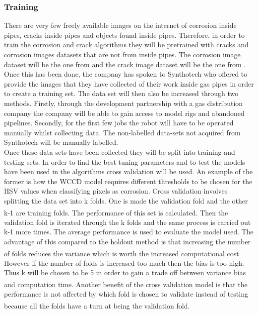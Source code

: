 \documentclass[11pt]{article}		%
\newcommand{\supercite}[1]{\textsuperscript{\cite{#1}}}		%
\begin{document}
        \subsubsection{Training}
	        There are very few freely available images on the internet of corrosion inside pipes, cracks inside pipes and objects found inside pipes. Therefore, in order to train the corrosion and crack algorithms they will be pretrained with cracks and corrosion images datasets that are not from inside pipes. The corrosion image dataset will be the one from \cite{WCCD} and the crack image dataset will be the one from \cite{CrackGAN1}.
	        \\
	        Once this has been done, the company has spoken to Synthotech who offered to provide the images that they have collected of their work inside gas pipes in order to create a training set. The data set will then also be increased through two methods. Firstly, through the development partnership with a gas distribution company the company will be able to gain access to model rigs and abandoned pipelines. Secondly, for the first few jobs the robot will have to be operated manually whilst collecting data. The non-labelled data-sets not acquired from Synthotech will be manually labelled.
	        \\
	        Once these data sets have been collected they will be split into training and testing sets. In order to find the best tuning parameters and to test the models have been used in the algorithms cross validation will be used. An example of the former is how the WCCD model requires different thresholds to be chosen for the HSV values when classifying pixels as corrosion. Cross validation involves splitting the data set into k folds. One is made the validation fold and the other k-1 are training folds.\supercite{Cross_Validation} The performance of this set is calculated. Then the validation fold is iterated through the k folds and the same process is carried out k-1 more times. The average performance is used to evaluate the model used. The advantage of this compared to the holdout method is that increasing the number of folds reduces the variance which is worth the increased computational cost.\supercite{Cross_Validation}\supercite{Cross_Validation2} However if the number of folds is increased too much then the bias is too high. Thus k will be chosen to be 5 in order to gain a trade off between variance bias and computation time.\supercite{Cross_Validation_Tradeoff} Another benefit of the cross validation model is that the performance is not affected by which fold is chosen to validate instead of testing because all the folds have a turn at being the validation fold. \supercite{Cross_Validation}
	        
\end{document}
